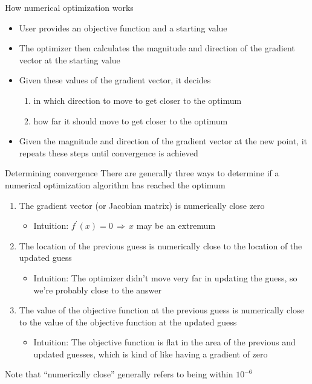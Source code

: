\documentclass[english,xcolor=dvipsnames]{beamer}
\begin{document}
\begin{frame}{How numerical optimization works}
	\begin{itemize}
		\item User provides an objective function and a starting value
		\item The optimizer then calculates the magnitude and direction of the gradient vector at the starting value
		\item Given these values of the gradient vector, it decides 
		\begin{enumerate}
			\item in which direction to move to get closer to the optimum
			\item how far it should move to get closer to the optimum
		\end{enumerate}
		\item Given the magnitude and direction of the gradient vector at the new point, it repeats these steps until convergence is achieved 
	\end{itemize}
\end{frame}

\begin{frame}{Determining convergence}
There are generally three ways to determine if a numerical optimization algorithm has reached the optimum
	\begin{enumerate}
		\item The gradient vector (or Jacobian matrix) is numerically close zero
		\begin{itemize}
			\item Intuition: $f^\prime (x) = 0 \, \Rightarrow \, x$ may be an extremum
		\end{itemize}
		\item The location of the previous guess is numerically close to the location of the updated guess
		\begin{itemize}
			\item Intuition: The optimizer didn't move very far in updating the guess, so we're probably close to the answer
		\end{itemize}
		\item The value of the objective function at the previous guess is numerically close to the value of the objective function at the updated guess
		\begin{itemize}
			\item Intuition: The objective function is flat in the area of the previous and updated guesses, which is kind of like having a gradient of zero
		\end{itemize} 
	\end{enumerate}
Note that ``numerically close'' generally refers to being within $10^{-6}$\\
\end{frame}
\end{document}
